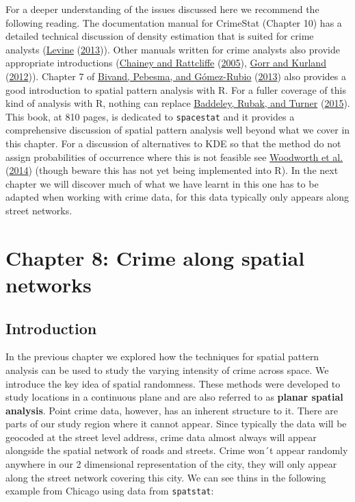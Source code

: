 \documentclass[
  krantz2]{krantz}
\begin{document}
For a deeper understanding of the issues discussed here we recommend the following reading. The documentation manual for CrimeStat (Chapter 10) has a detailed technical discussion of density estimation that is suited for crime analysts (\protect\hyperlink{ref-Levine_2013}{Levine} (\protect\hyperlink{ref-Levine_2013}{2013})). Other manuals written for crime analysts also provide appropriate introductions (\protect\hyperlink{ref-Chainey_2005}{Chainey and Rattcliffe} (\protect\hyperlink{ref-Chainey_2005}{2005}), \protect\hyperlink{ref-Gorr_2012}{Gorr and Kurland} (\protect\hyperlink{ref-Gorr_2012}{2012})). Chapter 7 of \protect\hyperlink{ref-Bivand_2013}{Bivand, Pebesma, and Gómez-Rubio} (\protect\hyperlink{ref-Bivand_2013}{2013}) also provides a good introduction to spatial pattern analysis with R. For a fuller coverage of this kind of analysis with R, nothing can replace \protect\hyperlink{ref-Baddeley_2016}{Baddeley, Rubak, and Turner} (\protect\hyperlink{ref-Baddeley_2016}{2015}). This book, at 810 pages, is dedicated to \texttt{spacestat} and it provides a comprehensive discussion of spatial pattern analysis well beyond what we cover in this chapter. For a discussion of alternatives to KDE so that the method do not assign probabilities of occurrence where this is not feasible see \protect\hyperlink{ref-Woodworth_2014}{Woodworth et al.} (\protect\hyperlink{ref-Woodworth_2014}{2014}) (though beware this has not yet being implemented into R). In the next chapter we will discover much of what we have learnt in this one has to be adapted when working with crime data, for this data typically only appears along street networks.

\hypertarget{chapter-8-crime-along-spatial-networks}{%
\chapter{Chapter 8: Crime along spatial networks}\label{chapter-8-crime-along-spatial-networks}}

\hypertarget{introduction-6}{%
\section{Introduction}\label{introduction-6}}

In the previous chapter we explored how the techniques for spatial pattern analysis can be used to study the varying intensity of crime across space. We introduce the key idea of spatial randomness. These methods were developed to study locations in a continuous plane and are also referred to as \textbf{planar spatial analysis}. Point crime data, however, has an inherent structure to it. There are parts of our study region where it cannot appear. Since typically the data will be geocoded at the street level address, crime data almost always will appear alongside the spatial network of roads and streets. Crime won´t appear randomly anywhere in our 2 dimensional representation of the city, they will only appear along the street network covering this city. We can see thins in the following example from Chicago using data from \texttt{spatstat}:
\end{document}
